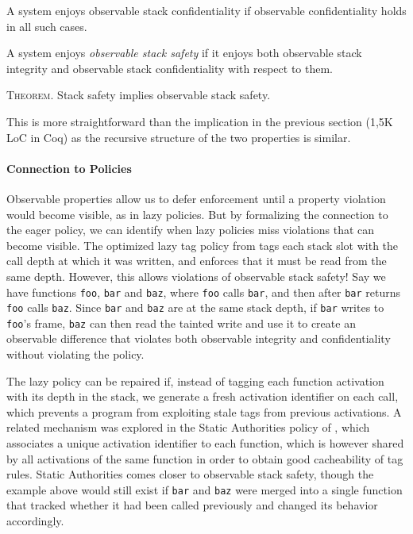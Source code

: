 \documentclass[acmsmall,review,anonymous]{acmart}\settopmatter{printfolios=true,printccs=false,printacmref=false}
\begin{document}
{      A system enjoys observable stack confidentiality if observable
      confidentiality holds in all such cases.

    A system enjoys {\em observable stack safety}
    if it enjoys both observable stack integrity and
      observable stack confidentiality with respect to them.

      \medskip
      \textsc{Theorem.}
      Stack safety implies observable stack safety.
      \smallskip

      This is more straightforward than the implication in the previous
      section (1,5K LoC in Coq) as the recursive
      structure of the two properties is similar.

    \paragraph{Connection to Policies}

    Observable properties allow us to defer enforcement until a property
    violation would become visible, as in lazy policies. But by formalizing
    the connection to the eager policy, we can identify when lazy policies
    miss violations that can become visible. The optimized lazy tag policy from
    \citet{DBLP:conf/sp/RoesslerD18} tags each stack slot with the call depth
    at which it was written, and enforces that it must be read from the
    same depth. However, this allows violations of observable stack safety!
    Say we have functions {\tt foo}, {\tt bar} and {\tt baz}, where {\tt foo}
    calls {\tt bar}, and then after {\tt bar} returns {\tt foo} calls
    {\tt baz}. Since {\tt bar} and {\tt baz} are at the same stack depth, if
    {\tt bar} writes to {\tt foo}'s frame, {\tt baz} can then read the tainted
    write and use it to create an observable difference that violates both
    observable integrity and confidentiality without violating the policy.

    The lazy policy can be repaired if, instead of tagging each function
    activation with its depth in the stack, we generate a fresh activation
    identifier on each call, which prevents a program from exploiting stale
    tags from previous activations. A related mechanism was explored in the
    Static Authorities policy of \citet{DBLP:conf/sp/RoesslerD18}, which
    associates a unique activation identifier to each function, which is
    however shared by all activations of the same function in order to obtain
    good cacheability of tag rules. Static Authorities comes closer to
    observable stack safety, though the example above would still exist
    if {\tt bar} and {\tt baz} were merged into a single function that tracked
    whether it had been called previously and changed its behavior accordingly.
    \ifaftersubmission{}\fi

}
\end{document}
